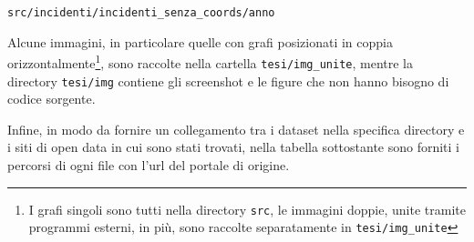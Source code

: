 \documentclass[a4paper,12pt]{report}
\newcommand{\filenamestyle}[1]{\texttt{#1}}
\newcommand{\skipline}{\vspace{0.2in}}
\begin{document}
\begin{center}
\skipline
\indent\filenamestyle{src/incidenti/incidenti\_senza\_coords/anno}

\skipline

Alcune immagini, in particolare quelle con grafi posizionati in coppia 
orizzontalmente\footnote{I grafi singoli sono tutti nella directory \filenamestyle{src}, 
le immagini doppie, unite tramite programmi esterni, in più, sono raccolte separatamente 
in \filenamestyle{tesi/img\_unite}}, sono raccolte nella 
cartella \filenamestyle{tesi/img\_unite}, 
mentre la directory \filenamestyle{tesi/img} contiene gli screenshot e le 
figure che non hanno bisogno di codice sorgente.

Infine, in modo da fornire un collegamento tra i dataset nella specifica directory e i siti 
di open data in cui sono stati trovati, nella tabella sottostante sono forniti i percorsi di 
ogni file con l'url del portale di origine.


\end{center}
\end{document}
